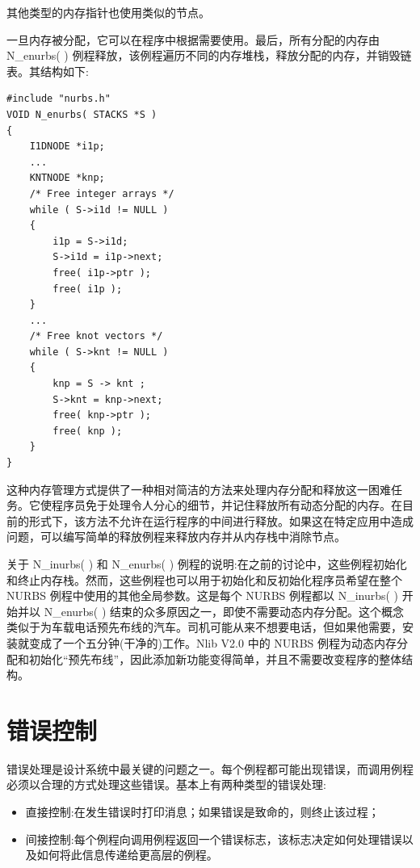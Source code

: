 \documentclass[../main.tex]{subfiles}
\begin{document}
其他类型的内存指针也使用类似的节点。

一旦内存被分配，它可以在程序中根据需要使用。最后，所有分配的内存由 N\_enurbs(   ) 例程释放，该例程遍历不同的内存堆栈，释放分配的内存，并销毁链表。其结构如下:

\begin{verbatim}
#include "nurbs.h"
VOID N_enurbs( STACKS *S )
{
    I1DNODE *i1p;
    ...
    KNTNODE *knp;
    /* Free integer arrays */
    while ( S->i1d != NULL )
    {
        i1p = S->i1d;
        S->i1d = i1p->next;
        free( i1p->ptr );
        free( i1p );
    }
    ...
    /* Free knot vectors */
    while ( S->knt != NULL )
    {
        knp = S -> knt ;
        S->knt = knp->next;
        free( knp->ptr );
        free( knp );
    }
}
\end{verbatim}

这种内存管理方式提供了一种相对简洁的方法来处理内存分配和释放这一困难任务。它使程序员免于处理令人分心的细节，并记住释放所有动态分配的内存。在目前的形式下，该方法不允许在运行程序的中间进行释放。如果这在特定应用中造成问题，可以编写简单的释放例程来释放内存并从内存栈中消除节点。

关于 N\_inurbs(   ) 和 N\_enurbs(   ) 例程的说明:在之前的讨论中，这些例程初始化和终止内存栈。然而，这些例程也可以用于初始化和反初始化程序员希望在整个 NURBS 例程中使用的其他全局参数。这是每个 NURBS 例程都以 N\_inurbs(   ) 开始并以 N\_enurbs(   ) 结束的众多原因之一，即使不需要动态内存分配。这个概念类似于为车载电话预先布线的汽车。司机可能从来不想要电话，但如果他需要，安装就变成了一个五分钟(干净的)工作。Nlib V2.0 中的 NURBS 例程为动态内存分配和初始化“预先布线”，因此添加新功能变得简单，并且不需要改变程序的整体结构。


\section{错误控制}


错误处理是设计系统中最关键的问题之一。每个例程都可能出现错误，而调用例程必须以合理的方式处理这些错误。基本上有两种类型的错误处理:

\begin{itemize}
\item 直接控制:在发生错误时打印消息；如果错误是致命的，则终止该过程；
\end{itemize}

\begin{itemize}
\item 间接控制:每个例程向调用例程返回一个错误标志，该标志决定如何处理错误以及如何将此信息传递给更高层的例程。
\end{itemize}
\end{document}
